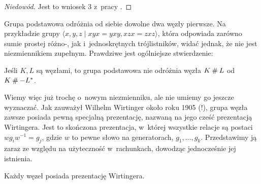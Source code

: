 \begin{proof}[Niedowód]
    Jest to wniosek 3 z~pracy \cite{feustel78}.
\end{proof}

Grupa podstawowa odróżnia od siebie dowolne dwa węzły pierwsze.
Na przykładzie grupy $\langle x,y,z \mid xyx=yxy,xzx=zxz\rangle$,
która odpowiada zarówno sumie prostej różno-, jak i~jednoskrętnych trójlistników,
widać jednak, że nie jest niezmiennikiem zupełnym.
Prawdziwe jest ogólniejsze stwierdzenie:

\begin{proposition}
    \label{prop:knot_group_sum}
    Jeśli $K, L$ są węzłami, to grupa podstawowa nie odróżnia węzła $K \mathbin{\#} L$ od $K \mathbin{\#} -L^*$.
\end{proposition}

Wiemy więc już trochę o~nowym niezmienniku, ale nie umiemy go jeszcze wyznaczać.
Jak zauważył Wilhelm Wirtinger około roku 1905 (!),
grupa węzła zawsze posiada pewną specjalną prezentację,
nazwaną na jego cześć prezentacją Wirtingera.
Jest to skończona prezentacja, w~której wszystkie relacje są postaci $w g_i w^{-1} = g_j$,
gdzie $w$ to pewne słowo na generatorach, $g_1, \ldots, g_k$.
Przedstawimy ją zaraz ze względu na użyteczność w~rachunkach,
dowodząc jednocześnie jej istnienia.

\begin{proposition}
    \label{prop:wirtinger}
    Każdy węzeł posiada prezentację Wirtingera.
\end{proposition}

